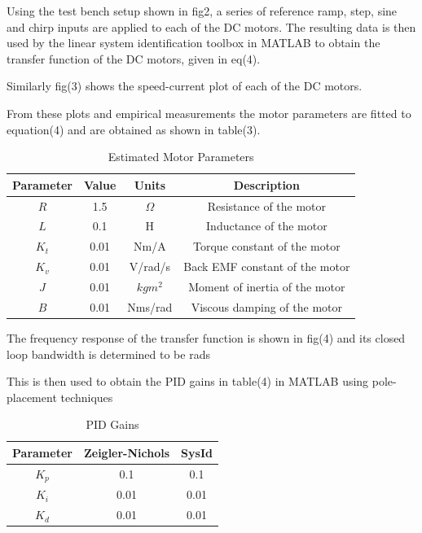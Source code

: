         Using the test bench setup shown in fig2, a series of reference ramp, step, 
        sine and chirp inputs are applied to each of the DC motors. 
        The resulting data is then used by the linear system identification toolbox in MATLAB 
        to obtain the transfer function of the DC motors, given in eq(4).

        Similarly fig(3) shows the speed-current plot of each of the DC motors.

        From these plots and empirical measurements the motor parameters are fitted to equation(4) and are obtained as shown in table(3).
        \begin{table}[H]
            \centering
            \begin{tabular}{|c|c|c|c|}
                \hline
                Parameter & Value & Units & Description \\
                \hline
                $R$ & 1.5 & $\Omega$ & Resistance of the motor \\
                $L$ & 0.1 & H & Inductance of the motor \\
                $K_t$ & 0.01 & Nm/A & Torque constant of the motor \\
                $K_v$ & 0.01 & V/rad/s & Back EMF constant of the motor \\
                $J$ & 0.01 & $kgm^2$ & Moment of inertia of the motor \\
                $B$ & 0.01 & Nms/rad & Viscous damping of the motor \\
                \hline
            \end{tabular}
            \caption{Estimated Motor Parameters}
        \end{table}

        The frequency response of the transfer function is shown in fig(4) and its closed loop bandwidth is determined to be rads

        This is then used to obtain the PID gains in table(4) in MATLAB using pole-placement techniques
        \begin{table}[H]
            \centering
            \begin{tabular}{|c|c|c|}
                \hline
                Parameter & Zeigler-Nichols & SysId \\
                \hline 
                $K_p$ & 0.1 & 0.1 \\
                $K_i$ & 0.01 & 0.01 \\
                $K_d$ & 0.01 & 0.01 \\
                \hline
            \end{tabular}
            \caption{PID Gains}
        \end{table}

